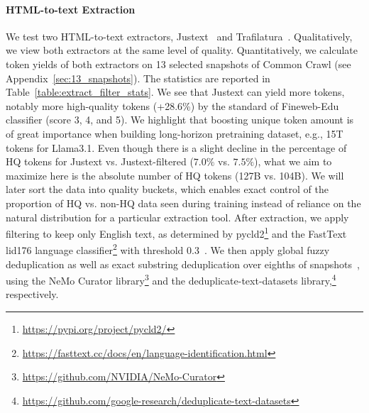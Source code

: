 \documentclass[11pt]{article}
\begin{document}

\paragraph{HTML-to-text Extraction} We test two HTML-to-text extractors, Justext~\citep{pomikalek2011removing} and Trafilatura~\citep{barbaresi-2021-trafilatura}. Qualitatively, we view both extractors at the same level of quality. Quantitatively, we calculate token yields of both extractors on 13 selected snapshots of Common Crawl (see Appendix~\ref{sec:13_snapshots}). The statistics are reported in Table~\ref{table:extract_filter_stats}. We see that Justext can yield more tokens, notably more high-quality tokens (+28.6\%) by the standard of Fineweb-Edu classifier (score 3, 4, and 5). We highlight that boosting unique token amount is of great importance when building long-horizon pretraining dataset, e.g., 15T tokens for Llama3.1. Even though there is a slight decline in the percentage of HQ tokens for Justext vs. Justext-filtered ($7.0\%$ vs. $7.5\%$), what we aim to maximize here is the absolute number of HQ tokens (127B vs. 104B). We will later sort the data into quality buckets, which enables exact control of the proportion of HQ vs. non-HQ data seen during training instead of reliance on the natural distribution for a particular extraction tool.
After extraction, we apply filtering to keep only English text, as determined by pycld2\footnote{\url{https://pypi.org/project/pycld2/}} and the FastText lid176 language classifier\footnote{\url{https://fasttext.cc/docs/en/language-identification.html}} with threshold 0.3~\citep{joulin2016fasttext,joulin2016bag}.
We then apply global fuzzy deduplication as well as exact substring deduplication over eighths of snapshots~\citep{lee2022deduplicating}, using the NeMo Curator library\footnote{\url{https://github.com/NVIDIA/NeMo-Curator}} and the deduplicate-text-datasets library,\footnote{\url{https://github.com/google-research/deduplicate-text-datasets}} respectively.
\end{document}
